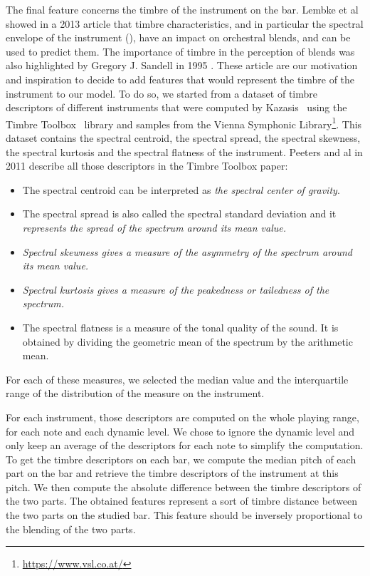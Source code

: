 \documentclass{article}
\newcommand{\fm}[1]{\textcolor{magenta}{FM: << #1 >>}}
\begin{document}
The final feature concerns the timbre of the instrument on the bar.
Lembke et al~\cite{spectral_envelope_Lembke} showed in a 2013 article that timbre characteristics, and in particular the spectral envelope of the instrument (), have an impact on orchestral blends, and can be used to predict them.
The importance of timbre in the perception of blends was also highlighted by Gregory J. Sandell in 1995 \cite{spectral_centroid}.
These article are our motivation and inspiration to decide to add features that would represent the timbre of the instrument to our model.
To do so, we started from a dataset of timbre descriptors of different instruments that were computed by Kazasis~\cite{kazazis2021} using the Timbre Toolbox~\cite{timbre_toolbox} library and samples from the Vienna Symphonic Library\footnote{\url{https://www.vsl.co.at/}}.
This dataset contains the spectral centroid, the spectral spread, the spectral skewness, the spectral kurtosis and the spectral flatness of the instrument.
Peeters and al in 2011 \cite{timbre_toolbox} describe all those descriptors in the Timbre Toolbox paper: 


\begin{itemize}
  \item The spectral centroid can be interpreted as \textit{the spectral center of gravity}.
  \item The spectral spread is also called the spectral standard deviation and it \textit{represents the spread of the spectrum around its mean value.}
  \item \textit{Spectral skewness gives a measure of the asymmetry of the spectrum around its mean value.}
  \item \textit{Spectral kurtosis gives a measure of the peakedness or tailedness of the spectrum.}
  \item The spectral flatness is a measure of the tonal quality of the sound. It is obtained by dividing the geometric mean of the spectrum by the arithmetic mean.
\end{itemize}
For each of these measures, we selected the median value and the interquartile range of the distribution of the measure on the instrument.


For each instrument, those descriptors are computed on the whole playing range, for each note and each dynamic level.
We chose to ignore the dynamic level and only keep an average of the descriptors for each note to simplify the computation.
To get the timbre descriptors on each bar, we compute the median pitch of each part on the bar and retrieve the timbre descriptors of the instrument at this pitch.
We then compute the absolute difference between the timbre descriptors of the two parts.
The obtained features represent a sort of timbre distance between the two parts on the studied bar. This feature should be inversely proportional to the blending of the two parts.
\end{document}
